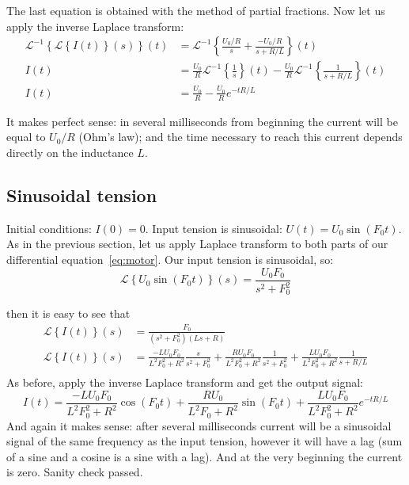 \documentclass{article}
\newcommand{\Laplace}[1]{\mathcal{L}\left\{#1\right\}(s)}
\newcommand{\ILaplace}[1]{\mathcal{L}^{-1}\left\{#1\right\}(t)}
\begin{document}
The last equation is obtained with the method of partial fractions.
Now let us apply the inverse Laplace transform:
\begin{align*}
\ILaplace{\Laplace{I(t)}}  & = \ILaplace{\frac{U_0/R}{s} + \frac{-U_0/R}{s+R/L}} \\
I(t)  & = \frac{U_0}{R}\ILaplace{\frac{1}{s}} - \frac{U_0}{R}\ILaplace{\frac{1}{s+R/L}}\\
I(t) & = \frac{U_0}{R} - \frac{U_0}{R}e^{-t R/L}
\end{align*}

It makes perfect sense: in several milliseconds from beginning the current will be equal to $U_0/R$ (Ohm's law); and the time necessary to reach this current depends directly on the inductance $L$.

\subsection{Sinusoidal tension}
Initial conditions: $I(0) = 0$. Input tension is sinusoidal: $U(t) = U_0\sin(F_0 t)$.
As in the previous section, let us apply Laplace transform to both parts of our differential equation~\eqref{eq:motor}. 
Our input tension is sinusoidal, so:
$$
\Laplace{U_0\sin(F_0t)} = \frac{U_0 F_0}{s^2 + F_0^2}
$$

then it is easy to see that
\begin{align*}
    \Laplace{I(t)}  & = \frac{F_0}{(s^2 + F_0^2)(Ls+R)} \\
    \Laplace{I(t)}  & = \frac{-L U_0 F_0}{L^2 F_0^2 + R^2}\frac{s}{s^2 + F_0^2} +  \frac{R U_0 F_0}{L^2 F_0^2 + R^2}\frac{1}{s^2 + F_0^2} + \frac{L U_0 F_0}{L^2 F_0^2 + R^2}\frac{1}{s + R/L}  \\
\end{align*}
As before, apply the inverse Laplace transform and get the output signal:
$$
I(t) = \frac{-L U_0 F_0}{L^2 F_0^2 + R^2}\cos(F_0t) +  \frac{R U_0}{L^2 F_0 + R^2}\sin(F_0 t) + \frac{L U_0 F_0}{L^2 F_0^2 + R^2}e^{-tR/L} 
$$
And again it makes sense: after several milliseconds current will be a sinusoidal signal of the same frequency as the input tension, however it will have a lag (sum of a sine and a cosine is a sine with a lag). And at the very beginning the current is zero. Sanity check passed.


\newpage
\end{document}
